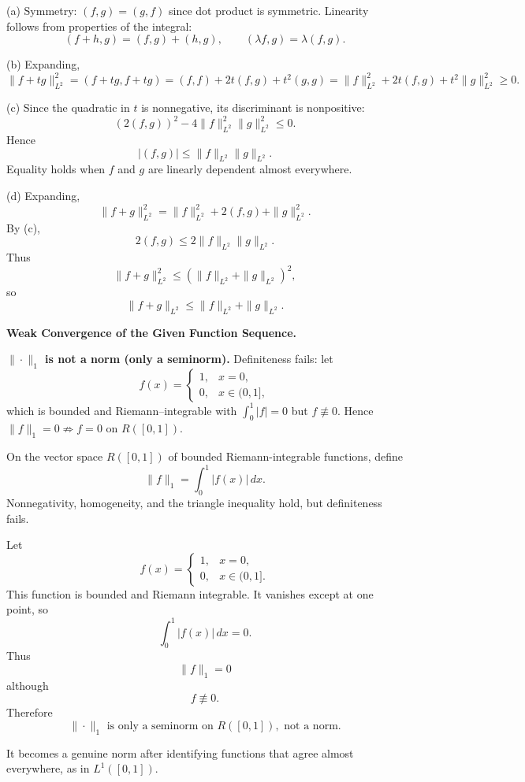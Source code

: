 \begin{solution}
(a) Symmetry: $(f,g)=(g,f)$ since dot product is symmetric. Linearity follows
	from properties of the integral:
	\[
	(f+h,g)=(f,g)+(h,g), \qquad (\lambda f,g)=\lambda(f,g).
	\]

	(b) Expanding,
	\[
	\|f+tg\|_{L^2}^2 = (f+tg,f+tg)
	= (f,f)+2t(f,g)+t^2(g,g)
	=\|f\|_{L^2}^2+2t(f,g)+t^2\|g\|_{L^2}^2\geq 0.
	\]

	(c) Since the quadratic in $t$ is nonnegative, its discriminant is nonpositive:
	\[
	(2(f,g))^2 - 4\|f\|_{L^2}^2\|g\|_{L^2}^2 \leq 0.
	\]
	Hence
	\[
	|(f,g)| \leq \|f\|_{L^2}\|g\|_{L^2}.
	\]
	Equality holds when $f$ and $g$ are linearly dependent almost everywhere.

	(d) Expanding,
	\[
	\|f+g\|_{L^2}^2 = \|f\|_{L^2}^2 + 2(f,g) + \|g\|_{L^2}^2.
	\]
	By (c),
	\[
	2(f,g) \leq 2\|f\|_{L^2}\|g\|_{L^2}.
	\]
	Thus
	\[
	\|f+g\|_{L^2}^2 \leq (\|f\|_{L^2}+\|g\|_{L^2})^2,
	\]
	so
	\[
	\|f+g\|_{L^2} \leq \|f\|_{L^2}+\|g\|_{L^2}.
	\]
\end{solution}

\begin{problem}[CP-II-0503]
\label{prob:cp-ii-0503}
\textbf{Weak Convergence of the Given Function Sequence.}

\hspace*{1.5em}\textbf{$\|\cdot\|_{1}$ is not a norm (only a seminorm).}
	Definiteness fails: let
	\[
	f(x)=\begin{cases}
		1, & x=0,\\
		0, & x\in (0,1],
	\end{cases}
	\]
	which is bounded and Riemann--integrable with $\int_{0}^{1}|f|=0$ but $f\not\equiv 0$.
	Hence $\|f\|_{1}=0\not\Rightarrow f=0$ on $R([0,1])$.
\end{problem}

\begin{solution}
On the vector space \(R([0,1])\) of bounded Riemann-integrable functions, define
\[
\|f\|_1
=
\int_0^1|f(x)|\,dx.
\]
Nonnegativity, homogeneity, and the triangle inequality hold, but definiteness fails.

Let
\[
f(x)
=
\begin{cases}
1,&x=0,\\
0,&x\in(0,1].
\end{cases}
\]
This function is bounded and Riemann integrable. It vanishes except at one point, so
\[
\int_0^1|f(x)|\,dx=0.
\]
Thus
\[
\|f\|_1=0
\]
although
\[
f\not\equiv0.
\]
Therefore
\[
\boxed{
\|\cdot\|_1
\text{ is only a seminorm on }R([0,1]),
\text{ not a norm}.
}
\]

It becomes a genuine norm after identifying functions that agree almost everywhere, as in
\(L^1([0,1])\).
\end{solution}



